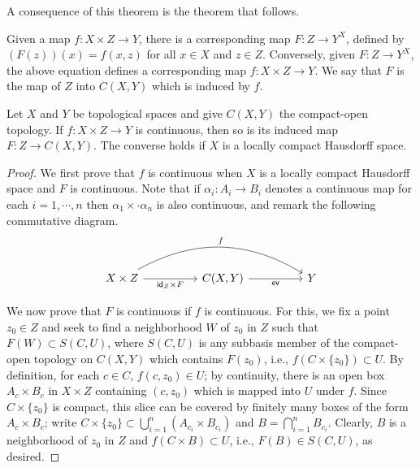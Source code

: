 A consequence of this theorem is the theorem that follows.
\begin{defi}
    Given a map $f: X\times Z\rightarrow Y$, there is a corresponding map $F: Z\rightarrow Y^X$, defined by $(F(z))(x)=f(x, z)$ for all $x\in X$ and $z\in Z$.
    Conversely, given $F: Z\rightarrow Y^X$, the above equation defines a corresponding map $f: X\times Z\rightarrow Y$.
    We say that $F$ is the map of $Z$ into $C(X, Y)$ which is induced by $f$.
\end{defi}
\begin{thm}
    Let $X$ and $Y$ be topological spaces and give $C(X, Y)$ the compact-open topology.
    If $f: X\times Z\rightarrow Y$ is continuous, then so is its induced map $F: Z\rightarrow C(X, Y)$.
    The converse holds if $X$ is a locally compact Hausdorff space.
\end{thm}
\begin{proof}
    We first prove that $f$ is continuous when $X$ is a locally compact Hausdorff space and $F$ is continuous.
    Note that if $\alpha_i: A_i\rightarrow B_i$ denotes a continuous map for each $i=1, \cdots, n$ then $\alpha_1\times\cdot\alpha_n$ is also continuous, and remark the following commutative diagram.
    \begin{equation*}
    \begin{tikzcd}[column sep=huge]
        X\times Z
        \arrow[rr, bend left, "f"]
        \arrow[r, "\textsf{id}_Z\times F"']
        &
        C(X, Y)\arrow[r, "\textsf{ev}"']
        &
        Y
    \end{tikzcd}
    \end{equation*}

    We now prove that $F$ is continuous if $f$ is continuous.
    For this, we fix a point $z_0\in Z$ and seek to find a neighborhood $W$ of $z_0$ in $Z$ such that $F(W)\subset S(C, U)$, where $S(C, U)$ is any subbasis member of the compact-open topology on $C(X, Y)$ which contains $F(z_0)$, i.e., $f(C\times\{z_0\})\subset U$.
    By definition, for each $c\in C$, $f(c, z_0)\in U$; by continuity, there is an open box $A_c\times B_c$ in $X\times Z$ containing $(c, z_0)$ which is mapped into $U$ under $f$.
    Since $C\times\{z_0\}$ is compact, this slice can be covered by finitely many boxes of the form $A_c\times B_c$; write $C\times\{z_0\}\subset\bigcup_{i=1}^n (A_{c_i}\times B_{c_i})$ and $B=\bigcap_{i=1}^n B_{c_i}$.
    Clearly, $B$ is a neighborhood of $z_0$ in $Z$ and $f(C\times B)\subset U$, i.e., $F(B)\in S(C, U)$, as desired.
\end{proof}
